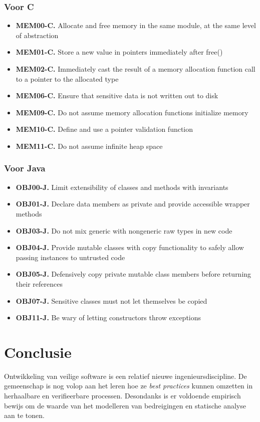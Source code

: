 \documentclass[../main.tex]{subfiles}
\begin{document}
\subsubsection{Voor C}
\begin{itemize}
	\item \textbf{MEM00-C.} Allocate and free memory in the same module, at the same level of abstraction
	\item \textbf{MEM01-C.} Store a new value in pointers immediately after free()
	\item \textbf{MEM02-C.} Immediately cast the result of a memory allocation function call to a pointer to the allocated type
	\item \textbf{MEM06-C.} Ensure that sensitive data is not written out to disk
	\item \textbf{MEM09-C.} Do not assume memory allocation functions initialize memory
	\item \textbf{MEM10-C.} Define and use a pointer validation function
	\item \textbf{MEM11-C.} Do not assume infinite heap space
\end{itemize}
\subsubsection{Voor Java}
\begin{itemize}
	\item \textbf{OBJ00-J.} Limit extensibility of classes and methods with invariants
	\item \textbf{OBJ01-J.} Declare data members as private and provide accessible wrapper methods
	\item \textbf{OBJ03-J.} Do not mix generic with nongeneric raw types in new code
	\item \textbf{OBJ04-J.} Provide mutable classes with copy functionality to safely allow passing instances to untrusted code
	\item \textbf{OBJ05-J.} Defensively copy private mutable class members before returning their references
	\item \textbf{OBJ07-J.} Sensitive classes must not let themselves be copied
	\item \textbf{OBJ11-J.} Be wary of letting constructors throw exceptions	
\end{itemize}


\section{Conclusie}
Ontwikkeling van veilige software is een relatief nieuwe ingenieursdiscipline.  De gemeenschap is nog volop aan het leren hoe ze \textit{best practices} kunnen omzetten in herhaalbare en verifieerbare processen. Desondanks is er voldoende empirisch bewijs om de waarde van het modelleren van bedreigingen en statische analyse aan te tonen.
\end{document}
